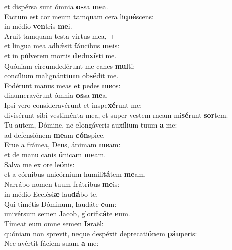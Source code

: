 \evenverse et dispérsa sunt ómnia \textbf{os}sa \textbf{me}a.\\
\oddverse Factum est cor meum tamquam cera li\textbf{qué}scens:~\*\\
\oddverse in médio \textbf{ven}tris \textbf{me}i.\\
\evenverse Aruit tamquam testa virtus mea,~+\\
\evenverse  et lingua mea adhǽsit fáucibus \textbf{me}is:~\*\\
\evenverse et in púlverem mortis \textbf{de}du\textbf{xí}sti me.\\
\oddverse Quóniam circumdedérunt me canes \textbf{mul}ti:~\*\\
\oddverse concílium malignánti\textbf{um} ob\textbf{sé}dit me.\\
\evenverse Fodérunt manus meas et pedes \textbf{me}os:~\*\\
\evenverse dinumeravérunt ómnia \textbf{os}sa \textbf{me}a.\\
\oddverse Ipsi vero consideravérunt et inspe\textbf{xé}runt me:~\*\\
\oddverse divisérunt sibi vestiménta mea, et super vestem meam mi\textbf{sé}runt \textbf{sor}tem.\\
\evenverse Tu autem, Dómine, ne elongáveris auxílium tuum \textbf{a} me:~\*\\
\evenverse ad defensiónem \textbf{me}am \textbf{cón}spice.\\
\oddverse Erue a frámea, Deus, ánimam \textbf{me}am:~\*\\
\oddverse et de manu canis \textbf{ú}nicam \textbf{me}am.\\
\evenverse Salva me ex ore le\textbf{ó}nis:~\*\\
\evenverse et a córnibus unicórnium humili\textbf{tá}tem \textbf{me}am.\\
\oddverse Narrábo nomen tuum frátribus \textbf{me}is:~\*\\
\oddverse in médio Ecclési\textbf{æ} lau\textbf{dá}bo te.\\
\evenverse Qui timétis Dóminum, laudáte \textbf{e}um:~\*\\
\evenverse univérsum semen Jacob, glorifi\textbf{cá}te \textbf{e}um.\\
\oddverse Tímeat eum omne semen \textbf{Is}raël:~\*\\
\oddverse quóniam non sprevit, neque despéxit deprecati\textbf{ó}nem \textbf{páu}peris:\\
\evenverse Nec avértit fáciem suam \textbf{a} me:~\*\\
